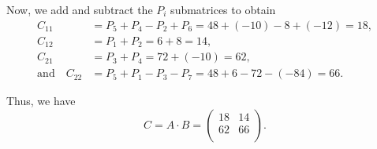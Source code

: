 Now, we add and subtract the $P_i$ submatrices to obtain
\begin{equation*}
  \begin{split}
    C_{11} &= P_5 + P_4 - P_2 + P_6 = 48 + (-10) - 8 + (-12) = 18, \\
    C_{12} &= P_1 + P_2 = 6 + 8 = 14, \\
    C_{21} &= P_3 + P_4 = 72 + (-10) = 62, \\
    \text{and} \quad C_{22} &= P_5 + P_1 - P_3 - P_7 = 48 + 6 - 72 - (-84) = 66.
  \end{split}
\end{equation*}

Thus, we have
\[
  C = A \cdot B =
  \begin{pmatrix}
    18 & 14 \\
    62 & 66 \\
  \end{pmatrix}.
\]
